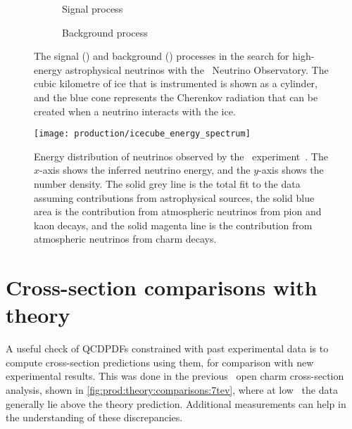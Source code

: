 \begin{figure}
  \begin{subfigure}[b]{0.5\textwidth}
    \centering
    
    \caption{Signal process}
    \label{fig:prod:theory:icecube:signal}
  \end{subfigure}
  \begin{subfigure}[b]{0.5\textwidth}
    \centering
    
    \caption{Background process}
    \label{fig:prod:theory:icecube:background}
  \end{subfigure}
  \caption{%
    The signal () and background 
    () processes in the search for 
    high-energy astrophysical neutrinos with the \icecube\ Neutrino 
    Observatory.
    The cubic kilometre of ice that is instrumented is shown as a cylinder, and 
    the blue cone represents the Cherenkov radiation that can be created when a 
    neutrino interacts with the ice.
  }
  \label{fig:prod:theory:icecube}
\end{figure}

\begin{figure}
  \centering
  \texttt{[image: production/icecube\_energy\_spectrum]}
  \caption{%
    Energy distribution of neutrinos observed by the \icecube\ 
    experiment~\cite{Aartsen:2014gkd}.
    The $x$-axis shows the inferred neutrino energy, and the $y$-axis shows the 
    number density.
    The solid grey line is the total fit to the data assuming contributions 
    from astrophysical sources, the solid blue area is the contribution from 
    atmospheric neutrinos from pion and kaon decays, and the solid magenta line 
    is the contribution from atmospheric neutrinos from charm decays.
  }
  \label{fig:prod:theory:icecube_energy}
\end{figure}

\section{Cross-section comparisons with theory}
\label{chap:prod:theory:comparisons}

A useful check of \acp{QCDPDF} constrained with past experimental data is to 
compute cross-section predictions using them, for comparison with new 
experimental results.
This was done in the previous \lhcb\ open charm cross-section analysis, shown 
in \cref{fig:prod:theory:comparisons:7tev}, where at low \pT\ the data 
generally lie above the theory prediction.
Additional measurements can help in the understanding of these discrepancies.


